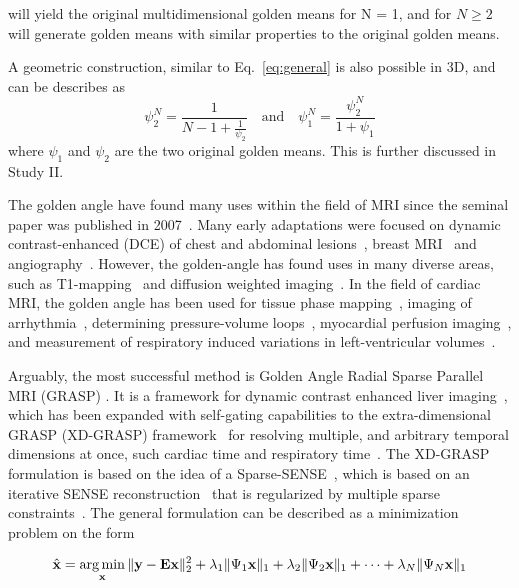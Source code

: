 will yield the original multidimensional golden means for N = 1, and for $N \geq 2$ will generate golden means with similar properties to the original golden means.

A geometric construction, similar to Eq.~\ref{eq:general} is also possible in 3D, and can be describes as
\begin{equation}
    \psi^N_2 =  \frac{1}{N - 1 + \frac{1}{\psi_2}} \quad \textrm{and} \quad \psi^N_1 = \frac{\psi^N_2}{1 + \psi_1}
\end{equation}
where $\psi_1$ and $\psi_2$ are the two original golden means. This is further discussed in Study II.

The golden angle have found many uses within the field of MRI since the seminal paper was published in 2007~\cite{Winkelmann2007}. Many early adaptations were focused on dynamic contrast-enhanced (DCE)  of chest and abdominal lesions~\cite{Lin2008}, breast MRI~\cite{Chan2009} and angiography~\cite{Prieto2010}. However, the golden-angle has found uses in many diverse areas, such as T1-mapping~\cite{Ehses2013, Tran-Gia2015} and diffusion weighted imaging~\cite{Seo2014}. In the field of cardiac MRI, the golden angle has been used for tissue phase mapping~\cite{Paul2016, Paul2016b}, imaging of arrhythmia~\cite{Contijoch2017}, determining pressure-volume loops~\cite{Witschey2014}, myocardial perfusion imaging~\cite{Sharif2014}, and measurement of respiratory induced variations in left-ventricular volumes~\cite{Holst2017, Holst2018, Holst2019}.

Arguably, the most successful method is Golden Angle Radial Sparse Parallel MRI (GRASP) . It is a framework for dynamic contrast enhanced liver imaging~\cite{Feng2014}, which has been expanded with self-gating capabilities to the extra-dimensional GRASP (XD-GRASP) framework~\cite{Feng2015} for resolving multiple, and arbitrary temporal dimensions at once, such cardiac time and respiratory time~\cite{Feng2018}. The XD-GRASP formulation is based on the idea of a Sparse-SENSE~\cite{Feng2013}, which is based on an iterative SENSE reconstruction~\cite{Pruessmann2001} that is regularized by multiple sparse constraints~\cite{Lustig2007}. The general formulation can be described as a minimization problem on the form

 \begin{equation}\label{eq:argmin}
	\hat{\textbf{x}} = \operatorname*{arg\,min}_{\textbf{x}} \|\textbf{y} - \textbf{E}\textbf{x} \|^2_2 + \lambda_1 \|\Psi_1\textbf{x}\|_1 + \lambda_2 \|\Psi_2\textbf{x}\|_1 + \dots + \lambda_N \|\Psi_N\textbf{x}\|_1
\end{equation}

